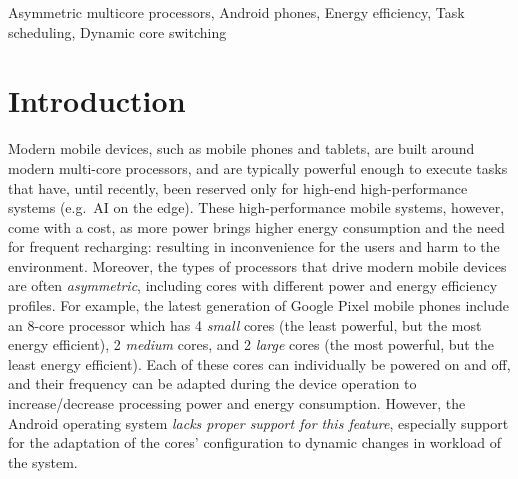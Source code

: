 \documentclass[conference]{IEEEtran}
\begin{document}
\begin{IEEEkeywords}
Asymmetric multicore processors, Android phones, Energy efficiency, Task scheduling, Dynamic core switching
\end{IEEEkeywords}

\section{Introduction}
Modern mobile devices, such as mobile phones and tablets, are built around modern multi-core processors, and are typically powerful enough to execute tasks that have, until recently, been reserved only for high-end high-performance systems (e.g.~AI on the edge). These high-performance mobile systems, however, come with a cost, as more power brings higher energy consumption and the need for frequent recharging: resulting in inconvenience for the users and harm to the environment. Moreover, the types of processors that drive modern mobile devices are often \emph{asymmetric}, including cores with different power and energy efficiency profiles. For example, the latest generation of Google Pixel mobile phones include an 8-core processor which has 4 \emph{small} cores (the least powerful, but the most energy efficient), 2 \emph{medium} cores, and 2 \emph{large} cores (the most powerful, but the least energy efficient). Each of these cores can individually be powered on and off, and their frequency can be adapted during the device operation to increase/decrease processing power and energy consumption. However, the Android operating system \emph{lacks proper support for this feature}, especially support for the adaptation of the cores' configuration to dynamic changes in workload of the system.
\end{document}
